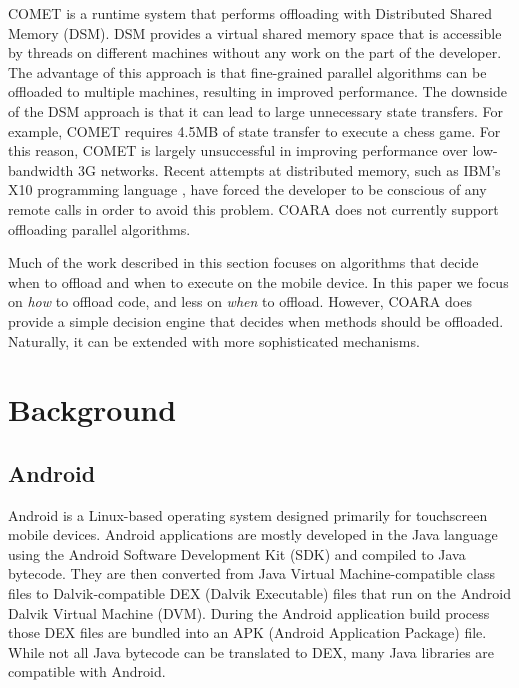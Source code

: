 \documentclass[10pt,journal,cspaper,compsoc]{IEEEtran}
\begin{document}
COMET \cite{Gordon:2012vu} is a runtime system that performs offloading with Distributed Shared Memory (DSM).  DSM provides a virtual shared memory space that is accessible by threads on different machines without any work on the part of the developer.  The advantage of this approach is that fine-grained parallel algorithms can be offloaded to multiple machines, resulting in improved performance.  The downside of the DSM approach is that it can lead to large unnecessary state transfers.  For example, COMET requires 4.5MB of state transfer to execute a chess game.  For this reason, COMET is largely unsuccessful in improving performance over low-bandwidth 3G networks.  Recent attempts at distributed memory, such as IBM's X10 programming language \cite{Charles:2005ud}, have forced the developer to be conscious of any remote calls in order to avoid this problem.
 COARA does not currently support offloading parallel algorithms.

Much of the work described in this section focuses on algorithms that decide when to offload and when to execute on the mobile device.  In this paper we focus on \emph{how} to offload code, and less on \emph{when} to offload.  However, COARA does provide a simple decision engine that decides when methods should be offloaded. Naturally, it can be extended with more sophisticated mechanisms.


\section{Background}
\label{sec:background}


\subsection{Android}
Android is a Linux-based operating system designed primarily for touchscreen mobile devices.  Android applications are mostly developed in the Java language using the Android Software Development Kit (SDK) and compiled to Java bytecode. They are then converted from Java Virtual Machine-compatible class files to Dalvik-compatible DEX (Dalvik Executable) files that run on the Android Dalvik Virtual Machine (DVM). During the Android application build process those DEX files are bundled into an APK (Android Application Package) file.  While not all Java bytecode can be translated to DEX, many Java libraries are compatible with Android.
\end{document}
